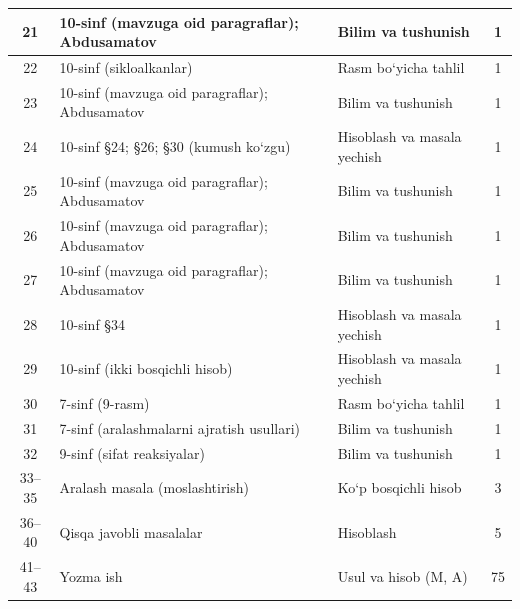 \documentclass[11pt,a4paper]{article}
\begin{document}
{\begin{longtable}{|c|p{7.2cm}|p{5.4cm}|c|}
21 & 10-sinf (mavzuga oid paragraflar); Abdusamatov & Bilim va tushunish & 1\\\hline
22 & 10-sinf (sikloalkanlar) & Rasm bo`yicha tahlil & 1\\\hline
23 & 10-sinf (mavzuga oid paragraflar); Abdusamatov & Bilim va tushunish & 1\\\hline
24 & 10-sinf \S{}24; \S{}26; \S{}30 (kumush ko`zgu) & Hisoblash va masala yechish & 1\\\hline
25 & 10-sinf (mavzuga oid paragraflar); Abdusamatov & Bilim va tushunish & 1\\\hline
26 & 10-sinf (mavzuga oid paragraflar); Abdusamatov & Bilim va tushunish & 1\\\hline
27 & 10-sinf (mavzuga oid paragraflar); Abdusamatov & Bilim va tushunish & 1\\\hline
28 & 10-sinf \S{}34 & Hisoblash va masala yechish & 1\\\hline
29 & 10-sinf (ikki bosqichli hisob) & Hisoblash va masala yechish & 1\\\hline
30 & 7-sinf (9-rasm) & Rasm bo`yicha tahlil & 1\\\hline
31 & 7-sinf (aralashmalarni ajratish usullari) & Bilim va tushunish & 1\\\hline
32 & 9-sinf (sifat reaksiyalar) & Bilim va tushunish & 1\\\hline
33--35 & Aralash masala (moslashtirish) & Ko`p bosqichli hisob & 3\\\hline
36--40 & Qisqa javobli masalalar & Hisoblash & 5\\\hline
41--43 & Yozma ish & Usul va hisob (M, A) & 75\\\hline
\end{longtable}}
\end{document}
